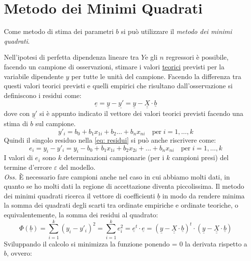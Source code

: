 \documentclass[]{article}
\def\doubleunderline#1{\underline{\underline{#1}}}
\begin{document}
\section{Metodo dei Minimi Quadrati}


Come metodo di stima dei parametri $b$ si può utilizzare il \textit{metodo dei minimi quadrati}.

Nell'ipotesi di perfetta dipendenza lineare tra $Y$e gli $n$ regressori è possibile, facendo un campione di osservazioni, stimare i valori \underline{teorici} previsti per la variabile dipendente $y$ per tutte le unità del campione. Facendo la differenza tra questi valori teorici previsti e quelli empirici che risultano dall'osservazione si definiscono i residui come:
\begin{equation}
\underline{e} = \underline{y} - \underline{y'} = \underline{y} - \doubleunderline{X} \cdot \underline{b}
\label{eq: residui}
\end{equation}
dove con $\underline{y'}$ si è appunto indicato il vettore dei valori teorici previsti facendo una stima di $b$ sul campione.
\begin{equation}
y'_i = b_0 + b_1 x_{1i} + b_2 \dots + b_n x_{ni} \quad \text{per} \; i= 1, \dots, k
\end{equation}
Quindi il singolo residuo nella \eqref{eq: residui} si può anche riscrivere come:
\begin{equation}
e_i = y_i - y'_i = y_i - b_0 + b_1 x_{1i} + b_2 x_{2i} + \dots + b_n x_{ni} \quad \text{per} \; i= 1, \dots, k
\end{equation}
I valori di $e_i$ sono $k$ determinazioni campionarie (per i $k$ campioni presi) del termine d'errore $\varepsilon$ del modello.\\
\textit{Oss.} È necessario fare campioni anche nel caso in cui abbiamo
molti dati, in quanto se ho molti dati la regione di accettazione
diventa piccolissima.
Il metodo dei minimi quadrati ricerca il vettore di coefficienti $\underline{b}$ in modo da rendere minima la somma dei quadrati degli scarti tra ordinate empiriche e ordinate teoriche, o equivalentemente, la somma dei residui al quadrato:
\begin{equation}
\Phi(\underline{b}) = \sum_{i=1}^k (y_i - y'_i)^2 = \sum_{i=1}^k e_i^2 = \underline{e}^t 	\cdot \underline{e} = (\underline{y} - \doubleunderline{X} \cdot \underline{b})^t \cdot (\underline{y} - \doubleunderline{X} \cdot \underline{b})
\end{equation}
Sviluppando il calcolo si minimizza la funzione ponendo = 0 la derivata rispetto a $b$, ovvero:
\end{document}

